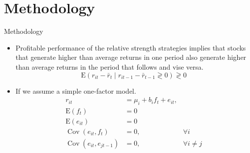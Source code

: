 \documentclass{beamer}
\begin{document}
\section{Methodology}

\begin{frame}{Methodology}
    \begin{itemize}
        \item Profitable performance of the relative strength strategies implies that stocks that generate higher than average returns in one period also generate higher than average returns in the period that follows and vise versa.
              \[
                  \mathrm{E}\left(r_{i t}-\bar{r}_{t} \mid r_{i t-1}-\bar{r}_{t-1}  \gtrless  0\right)\gtrless 0
              \]
        \item If we assume a simple one-factor model.
              \[
                  \begin{array}{rlr}
                      r_{i t}                                           & =\mu_{i}+b_{i} f_{t}+e_{i t},                    \\
                      \mathrm{E}\left(f_{t}\right)                      & =0                            &                  \\
                      \mathrm{E}\left(e_{i t}\right)                    & =0                            &                  \\
                      \operatorname{Cov}\left(e_{i t}, f_{t}\right)     & =0,                           & \forall i        \\
                      \operatorname{Cov}\left(e_{i t}, e_{j t-1}\right) & =0,                           & \forall i \neq j
                  \end{array}
              \]
    \end{itemize}
\end{frame}
\end{document}
